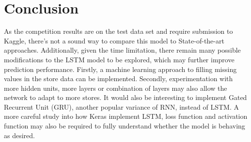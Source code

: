 \documentclass[DIV=calc, paper=a4, fontsize=11pt, twocolumn]{scrartcl}
\begin{document}
\section{Conclusion}
As the competition results are on the test data set and require submission to Kaggle, there's not a sound way to compare this model to State-of-the-art approaches. Additionally, given the time limitation, there remain many possible modifications to the LSTM model to be explored, which may further improve prediction performance. Firstly, a machine learning approach to filling missing values in the store data can be implemented. Secondly, experimentation with more hidden units, more layers or combination of layers may also allow the network to adapt to more stores. It would also be interesting to implement Gated Recurrent Unit (GRU), another popular variance of RNN, instead of LSTM. A more careful study into how Keras implement LSTM, loss function and activation function may also be required to fully understand whether the model is behaving as desired.



\end{document}
